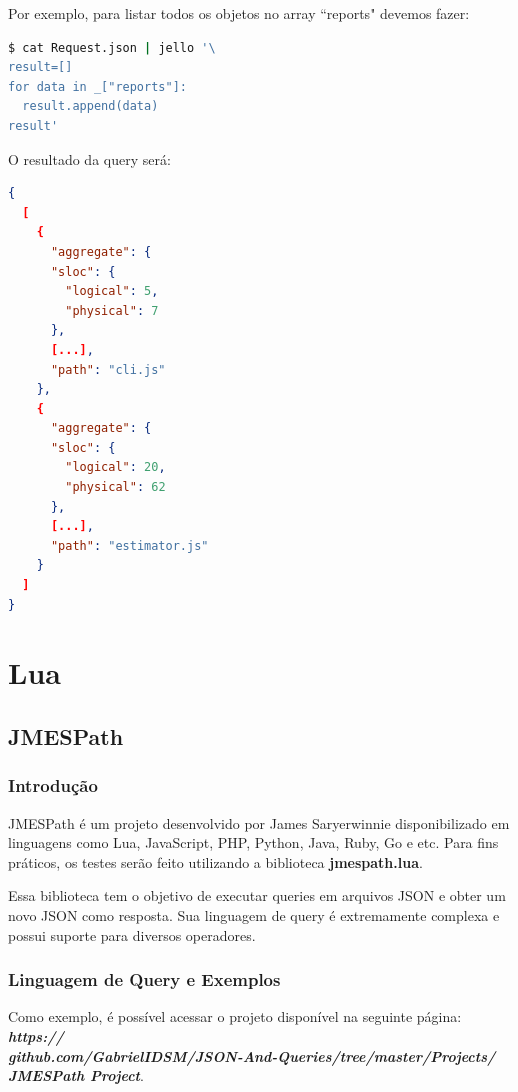 \documentclass[a4paper, 12pt] {article}
\begin{document}
				Por exemplo, para listar todos os objetos no array “reports" devemos fazer:
\begin{lstlisting}[language=bash]
$ cat Request.json | jello '\
result=[]
for data in _["reports"]:
  result.append(data)
result'
\end{lstlisting}

				\newpage O resultado da query será:
\begin{lstlisting}[language=json,firstnumber=1]
{
  [
    {
      "aggregate": {
      "sloc": {
        "logical": 5,
        "physical": 7
      },
      [...],
      "path": "cli.js"
    },
    {
      "aggregate": {
      "sloc": {
        "logical": 20,
        "physical": 62
      },
      [...],
      "path": "estimator.js"
    }
  ]
}
\end{lstlisting}
	\newpage \section{Lua}
		\subsection{JMESPath}
			\subsubsection{Introdução}
				JMESPath é um projeto desenvolvido por James Saryerwinnie disponibilizado em linguagens como Lua, JavaScript, PHP, Python, Java, Ruby, Go e etc. Para fins práticos, os testes serão feito utilizando a biblioteca \textbf{jmespath.lua}.

				Essa biblioteca tem o objetivo de executar queries em arquivos JSON e obter um novo JSON como resposta. Sua linguagem de query é extremamente complexa e possui suporte para diversos operadores.
			\subsubsection{Linguagem de Query e Exemplos}
				Como exemplo, é possível acessar o projeto disponível na seguinte página: \textbf{\textit{https://\\github.com/GabrielIDSM/JSON-And-Queries/tree/master/Projects/\\JMESPath Project}}.
\end{document}
